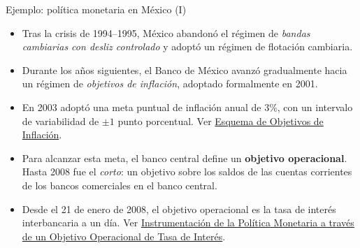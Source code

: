 \documentclass[aspectratio=169,11pt]{beamer}
\newcommand{\cidehighlight}[1]{\textcolor{CIDEBlue}{\bfseries #1}}
\begin{document}
\begin{frame}{Ejemplo: política monetaria en México (I)}
  \small
  \begin{itemize}
    \setlength{\itemsep}{0.55em}

    \item Tras la crisis de 1994--1995, México abandonó el régimen de \textit{bandas cambiarias con desliz controlado} y adoptó un régimen de flotación cambiaria.

    \item Durante los años siguientes, el Banco de México avanzó gradualmente hacia un régimen de \textit{objetivos de inflación}, adoptado formalmente en 2001.

    \item En 2003 adoptó una meta puntual de inflación anual de 3\%, con un intervalo de variabilidad de $\pm 1$ punto porcentual. Ver \href{https://www.banxico.org.mx/politica-monetaria/d/\%7BE0B64CFA-4903-B643-978E-AA348BC3C2CD\%7D.pdf}{Esquema de Objetivos de Inflación}.

    \item Para alcanzar esta meta, el banco central define un \cidehighlight{objetivo operacional}. Hasta 2008 fue el \textit{corto}: un objetivo sobre los saldos de las cuentas corrientes de los bancos comerciales en el banco central.

    \item Desde el 21 de enero de 2008, el objetivo operacional es la tasa de interés interbancaria a un día. Ver \href{https://www.banxico.org.mx/politica-monetaria/d/\%7B5EC0B4E4-0EB1-6363-14E5-93EAE6028158\%7D.pdf}{Instrumentación de la Política Monetaria a través de un Objetivo Operacional de Tasa de Interés}.

  \end{itemize}
\end{frame}
\end{document}
